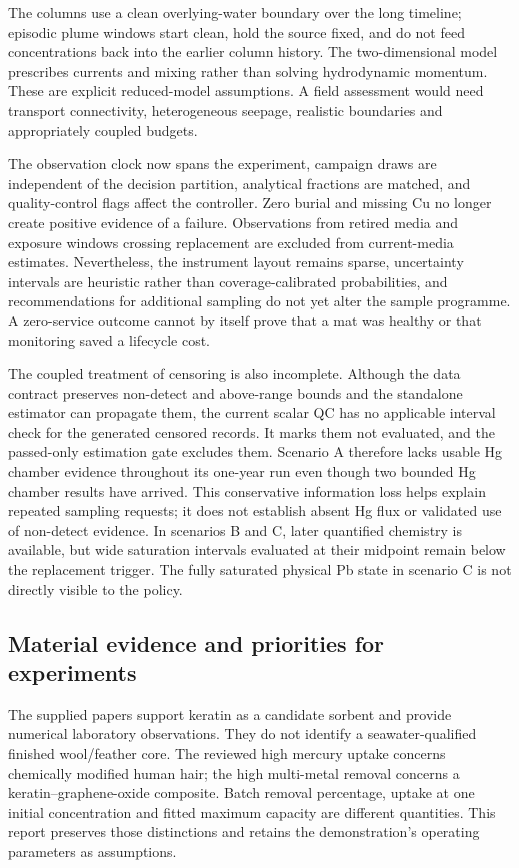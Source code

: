 The columns use a clean overlying-water boundary over the long timeline; episodic plume windows start clean, hold the source fixed, and do not feed concentrations back into the earlier column history. The two-dimensional model prescribes currents and mixing rather than solving hydrodynamic momentum. These are explicit reduced-model assumptions. A field assessment would need transport connectivity, heterogeneous seepage, realistic boundaries and appropriately coupled budgets.

The observation clock now spans the experiment, campaign draws are independent of the decision partition, analytical fractions are matched, and quality-control flags affect the controller. Zero burial and missing Cu no longer create positive evidence of a failure. Observations from retired media and exposure windows crossing replacement are excluded from current-media estimates. Nevertheless, the instrument layout remains sparse, uncertainty intervals are heuristic rather than coverage-calibrated probabilities, and recommendations for additional sampling do not yet alter the sample programme. A zero-service outcome cannot by itself prove that a mat was healthy or that monitoring saved a lifecycle cost.

The coupled treatment of censoring is also incomplete. Although the data contract preserves non-detect and above-range bounds and the standalone estimator can propagate them, the current scalar QC has no applicable interval check for the generated censored records. It marks them not evaluated, and the passed-only estimation gate excludes them. Scenario A therefore lacks usable Hg chamber evidence throughout its one-year run even though two bounded Hg chamber results have arrived. This conservative information loss helps explain repeated sampling requests; it does not establish absent Hg flux or validated use of non-detect evidence. In scenarios B and C, later quantified chemistry is available, but wide saturation intervals evaluated at their midpoint remain below the replacement trigger. The fully saturated physical Pb state in scenario C is not directly visible to the policy.

\subsection{Material evidence and priorities for experiments}
The supplied papers support keratin as a candidate sorbent and provide numerical laboratory observations. They do not identify a seawater-qualified finished wool/feather core. The reviewed high mercury uptake concerns chemically modified human hair; the high multi-metal removal concerns a keratin--graphene-oxide composite. Batch removal percentage, uptake at one initial concentration and fitted maximum capacity are different quantities. This report preserves those distinctions and retains the demonstration's operating parameters as assumptions.

